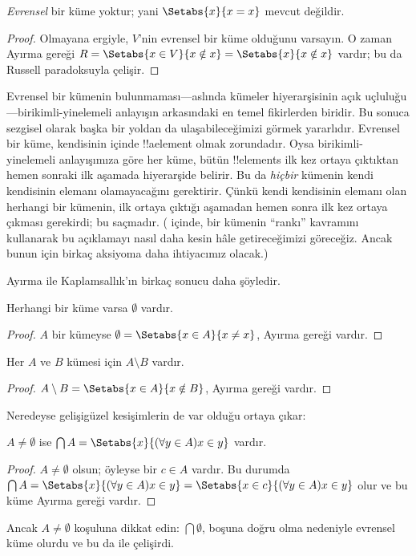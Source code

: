 \begin{thm}
\emph{Evrensel} bir küme yoktur; yani $\Setabs{x}{x = x}$ mevcut değildir.
\end{thm}

\begin{proof}
Olmayana ergiyle, $V$'nin evrensel bir küme olduğunu varsayın. O zaman
Ayırma gereği $R = \Setabs{x \in V}{x \notin x} =
\Setabs{x}{x \notin x}$ vardır; bu da Russell paradoksuyla çelişir.
\end{proof}

Evrensel bir kümenin bulunmaması---aslında kümeler hiyerarşisinin açık
uçluluğu---birikimli-yinelemeli anlayışın arkasındaki en temel fikirlerden
biridir. Bu sonuca sezgisel olarak başka bir yoldan da ulaşabileceğimizi
görmek yararlıdır. Evrensel bir küme, kendisinin içinde !!a{element}
olmak zorundadır. Oysa birikimli-yinelemeli anlayışımıza göre her küme,
bütün !!{element}s ilk kez ortaya çıktıktan hemen sonraki ilk aşamada
hiyerarşide belirir. Bu da \emph{hiçbir} kümenin kendi kendisinin elemanı
olamayacağını gerektirir. Çünkü kendi kendisinin elemanı olan herhangi bir
kümenin, ilk ortaya çıktığı aşamadan hemen sonra ilk kez ortaya çıkması
gerekirdi; bu saçmadır. ( içinde,
bir kümenin ``rankı'' kavramını kullanarak bu açıklamayı nasıl daha kesin
hâle getireceğimizi göreceğiz. Ancak bunun için birkaç aksiyoma daha
ihtiyacımız olacak.)

Ayırma ile Kaplamsallık'ın birkaç sonucu daha şöyledir.

\begin{prop}
Herhangi bir küme varsa $\emptyset$ vardır.
\end{prop}

\begin{proof}
$A$ bir kümeyse $\emptyset = \Setabs{x \in A}{x \neq x}$, Ayırma gereği
vardır.
\end{proof}

\begin{prop}
Her $A$ ve $B$ kümesi için $A \setminus B$ vardır.
\end{prop}

\begin{proof}
$A \setminus B = \Setabs{x \in A}{x \notin B}$, Ayırma gereği vardır.
\end{proof}

Neredeyse gelişigüzel kesişimlerin de var olduğu ortaya çıkar:

\begin{prop}
$A \neq \emptyset$ ise
$\bigcap A = \Setabs{x}{(\forall y \in A)x \in y}$ vardır.
\end{prop}

\begin{proof}
$A \neq \emptyset$ olsun; öyleyse bir $c \in A$ vardır. Bu durumda
$\bigcap A = \Setabs{x}{(\forall y \in A)x \in y} =
\Setabs{x \in c}{(\forall y \in A)x \in y}$ olur ve bu küme Ayırma
gereği vardır.
\end{proof}

Ancak $A \neq \emptyset$ koşuluna dikkat edin: $\bigcap\emptyset$,
boşuna doğru olma nedeniyle evrensel küme olurdu ve bu da
 ile çelişirdi.

